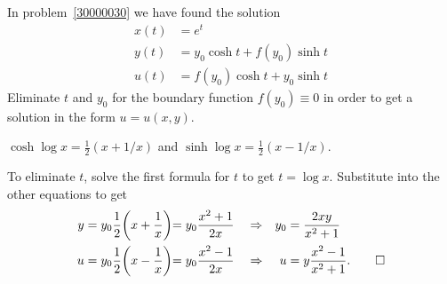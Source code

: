 In problem~\ref{30000030} we have found the solution
\begin{align*}
x(t) &= e^t           \\
y(t) &= y_0 \cosh t + f(y_0) \sinh t   \\
u(t) &= f(y_0) \cosh t + y_0 \sinh t
\end{align*}
Eliminate $t$ and $y_0$ for the boundary function $f(y_0)\equiv 0$ in order
to get a solution in the form $u = u(x,y)$.

\begin{hinweis}
$\cosh \log x = \frac12(x+1/x)$ and
$\sinh \log x = \frac12(x-1/x)$.
\end{hinweis}

\begin{loesung}
To eliminate $t$, solve the first formula for $t$ to get $t=\log x$.
Substitute into the other equations to get
\begin{align*}
y &= y_0 \frac12\biggl(x+\frac1x\biggl) = y_0\frac{x^2+1}{2x}
&&\Rightarrow &
y_0 &= \frac{2xy}{x^2+1}\\
u &= y_0 \frac12\biggl(x-\frac1x\biggl) = y_0\frac{x^2-1}{2x}
&&\Rightarrow &
u &= y\frac{x^2-1}{x^2+1}.
\qedhere
\end{align*}
\end{loesung}




